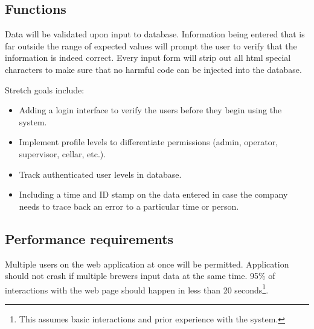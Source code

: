 \documentclass[draftclsnofoot,onecolumn,letterpaper,10pt,compsoc]{IEEEtran}
\begin{document}
	\subsection{Functions}

		Data will be validated upon input to database.
		Information being entered that is far outside the range of expected values will prompt the user to verify that the information is indeed correct.
		Every input form will strip out all html special characters to make sure that no harmful code can be injected into the database.

		Stretch goals include:
		\begin{itemize}
			\item{Adding a login interface to verify the users before they begin using the system.}
            
            \item{Implement profile levels to differentiate permissions (admin, operator, supervisor, cellar, etc.).}
            
            \item{Track authenticated user levels in database.}

			\item{Including a time and ID stamp on the data entered in case the company needs to trace back an error to a particular time or person.}
		\end{itemize}

	\subsection{Performance requirements}
		Multiple users on the web application at once will be permitted.
        Application should not crash if multiple brewers input data at the same time.
		95\% of interactions with the web page should happen in less than 20 seconds\footnote{This assumes basic interactions and prior experience with the system.}.
\end{document}
